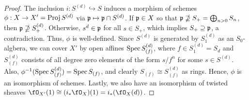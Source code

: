 \documentclass[a4paper]{article}
\begin{document}
\begin{enumerate} [label=\textbf{\arabic*.}, leftmargin=0em]
\begin{proof}
    The inclusion $i : S^{(d)} \hookrightarrow S$ induces a morphism of schemes $\phi : X \to X' = \operatorname{Proj}{S^{(d)}}$ via $\mathfrak{p} \mapsto \mathfrak{p} \cap S^{(d)}$. If $\mathfrak{p} \in X$ so that $\goth{p} \nsupseteq S_+ = \bigoplus_{n > 0} S_n$, then $\mathfrak{p} \nsupseteq S_+^{(d)}$. Otherwise, $s^d \in \mathfrak{p}$ for all $s \in S_+$, which implies $S_+ \supseteq \mathfrak{p}$, a contradiction. Thus, $\phi$ is well-defined. Since $S^{(d)}$ is generated by $S^{(d)}_1$ as an $S_0$-algbera, we can cover $X'$ by open affines $\operatorname{Spec}{S^{(d)}_{(f)}}$, where $f \in S^{(d)}_1 = S_d$ and $S^{(d)}_{(f)}$ consists of all degree zero elements of the form $s / f^n$ for some $s \in S^{(d)}$. Also, $\phi^{-1}(\operatorname{Spec}{S^{(d)}_{(f)}}) = \operatorname{Spec}{S_{(f)}}$, and clearly $S_{(f)} \cong S_{(f)}^{(d)}$ as rings. Hence, $\phi$ is an isomorphism of schemes. Lastly, we also have an isomorphism of twisted sheaves $\fO_{X'}(1) \cong (i_* \fO_{X})(1) = i_*(\fO_X(d))$.
\end{proof}


\end{enumerate}
\end{document}
